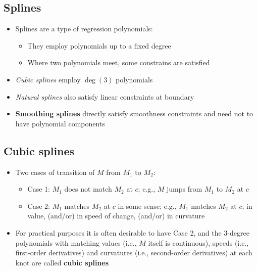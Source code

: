 \documentclass[]{article}
\providecommand{\tightlist}{%
  \setlength{\itemsep}{0pt}\setlength{\parskip}{0pt}}
\begin{document}
\subsection{Splines}\label{splines}

\begin{itemize}
\tightlist
\item
  Splines are a type of regression polynomials:

  \begin{itemize}
  \tightlist
  \item
    They employ polynomials up to a fixed degree
  \item
    Where two polynomials meet, some constrains are satisfied
  \end{itemize}
\item
  \emph{Cubic splines} employ \(\deg(3)\) polynomials
\item
  \emph{Natural splines} also satisfy linear constraints at boundary
\item
  \textbf{Smoothing splines} directly satisfy smoothness constraints and
  need not to have polynomial components
\end{itemize}

\subsection{Cubic splines}\label{cubic-splines}

\begin{itemize}
\item
  Two cases of transition of \(M\) from \(M_{1}\) to \(M_{2}\):

  \begin{itemize}
  \tightlist
  \item
    Case 1: \(M_{1}\) does not match \(M_{2}\) at \(c\); e.g., \(M\)
    jumps from \(M_{1}\) to \(M_{2}\) at \(c\)
  \item
    Case 2: \(M_{1}\) matches \(M_{2}\) at \(c\) in some sense; e.g.,
    \(M_{1}\) matches \(M_{2}\) at \(c\), in value, (and/or) in speed of
    change, (and/or) in curvature
  \end{itemize}
\item
  For practical purposes it is often desirable to have Case 2, and the
  \(3\)-degree polynomials with matching values (i.e., \(M\) itself is
  continuous), speeds (i.e., first-order derivatives) and curvatures
  (i.e., second-order derivatives) at each knot are called \textbf{cubic
  splines}
\end{itemize}
\end{document}
